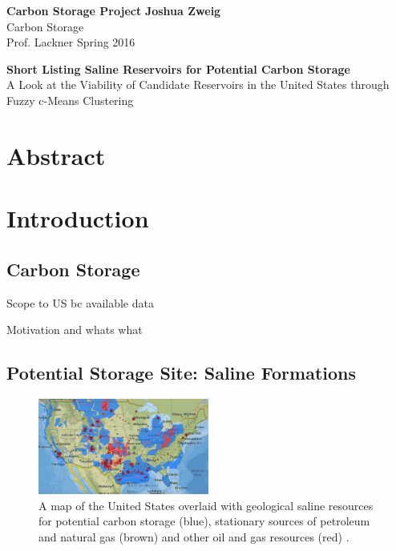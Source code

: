 \documentclass[letterpaper, 12pt]{article}
\begin{document}
\noindent
\large\textbf{Carbon Storage Project} \hfill \textbf{Joshua Zweig} \\
\normalsize Carbon Storage \\
Prof. Lackner \hfill Spring 2016 \\

\begin{centering}
\textbf{Short Listing Saline Reservoirs for Potential Carbon Storage} \\
A Look at the Viability of Candidate Reservoirs in the United States through\\
Fuzzy c-Means Clustering\\
\end{centering}

\section*{Abstract}


\section{Introduction}
\subsection{Carbon Storage}
Scope to US bc available data


Motivation and whats what

\subsection{Potential Storage Site: Saline Formations}

\begin{figure} %
    \centering
    \includegraphics[width=0.5\textwidth]{saline_tight}
    \caption{\label{salinetight} A map of the United States overlaid with geological saline resources for potential carbon storage (blue), stationary sources of petroleum and natural gas (brown) and other oil and gas resources (red) \cite{atlas}.}
\end{figure}
\end{document}
